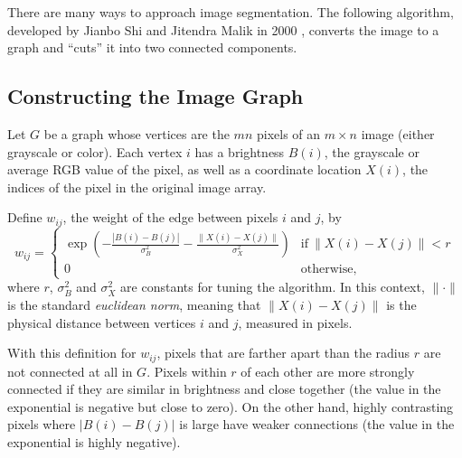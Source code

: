 There are many ways to approach image segmentation.
The following algorithm, developed by Jianbo Shi and Jitendra Malik in 2000 \cite{Shi2000}, converts the image to a graph and ``cuts'' it into two connected components.

\subsection*{Constructing the Image Graph} %

Let $G$ be a graph whose vertices are the $mn$ pixels of an $m\times n$ image (either grayscale or color).
Each vertex $i$ has a brightness $B(i)$, the grayscale or average RGB value of the pixel, as well as a coordinate location $X(i)$, the indices of the pixel in the original image array.

Define $w_{ij}$, the weight of the edge between pixels $i$ and $j$, by
\begin{equation}
\label{eq:imgseg-edge-weight}
w_{ij} = \begin{cases}
\exp\left(-\frac{|B(i) - B(j)|}{\sigma_B^2}-\frac{\|X(i) - X(j)\|}{\sigma_X^2}\right) & \text{if}\ \|X(i) - X(j)\| < r \\ 0 & \text{otherwise,}
\end{cases}
\end{equation}
where $r$, $\sigma_B^2$ and $\sigma_X^2$ are constants for tuning the algorithm.
In this context, $\|\cdot\|$ is the standard \emph{euclidean norm}, meaning that $\|X(i) - X(j)\|$ is the physical distance between vertices $i$ and $j$, measured in pixels.

With this definition for $w_{ij}$, pixels that are farther apart than the radius $r$ are not connected at all in $G$.
Pixels within $r$ of each other are more strongly connected if they are similar in brightness and close together (the value in the exponential is negative but close to zero).
On the other hand, highly contrasting pixels where $|B(i) - B(j)|$ is large have weaker connections (the value in the exponential is highly negative).

